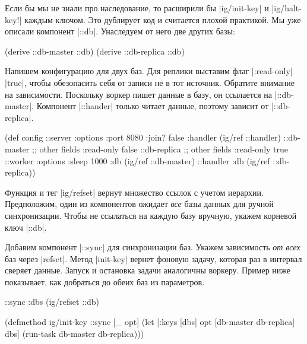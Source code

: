 Если бы мы не знали про наследование, то расширили бы \spverb|ig/init-key| и
\spverb|ig/halt-key!| каждым ключом. Это дублирует код и считается плохой
практикой. Мы уже описали компонент \spverb|::db|. Унаследуем от него две других
базы:

\begin{english}
  \begin{clojure}
(derive ::db-master ::db)
(derive ::db-replica ::db)
  \end{clojure}
\end{english}

Напишем конфигурацию для двух баз. Для реплики выставим флаг \spverb|:read-only|
\spverb|true|, чтобы обезопасить себя от записи не в тот источник. Обратите
внимание на зависимости. Поскольку воркер пишет данные в базу, он ссылается на
\spverb|::db-master|. Компонент \spverb|::hander| только читает данные, поэтому
зависит от \spverb|::db-replica|.

\begin{english}
  \begin{clojure}
(def config
  {::server {:options {:port 8080 :join? false}
             :handler (ig/ref ::handler)}
   ::db-master {;; other fields
                :read-only false}
   ::db-replica {;; other fields
                 :read-only true}
   ::worker {:options {:sleep 1000}
             :db (ig/ref ::db-master)}
   ::handler {:db (ig/ref ::db-replica)}})
  \end{clojure}
\end{english}

Функция и тег \spverb|ig/refset| вернут множество ссылок с учетом
иерархии. Предположим, один из компонентов ожидает \emph{все} базы данных для
ручной синхронизации. Чтобы не ссылаться на каждую базу вручную, укажем корневой
ключ \spverb|::db|.

Добавим компонент \spverb|::sync| для синхронизации баз. Укажем зависимость
\emph{от всех} баз через \spverb|refset|. Метод \spverb|init-key| вернет фоновую
задачу, которая раз в интервал сверяет данные. Запуск и остановка задачи
аналогичны воркеру. Пример ниже показывает, как добраться до обеих баз из
параметров.

\begin{english}
  \begin{clojure}
{::sync {:dbs (ig/refset ::db)}}

(defmethod ig/init-key ::sync
  [_ opt]
  (let [{:keys [dbs]} opt
        [db-master db-replica] dbs]
    (run-task db-master db-replica)))
  \end{clojure}
\end{english}

